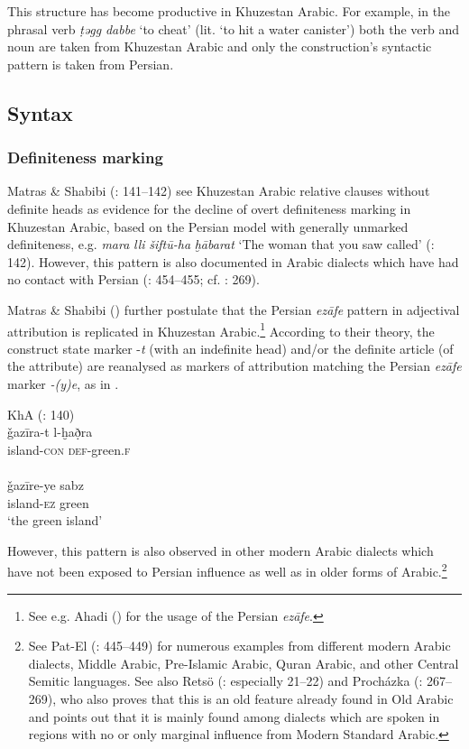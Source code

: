 \documentclass[output=paper,nonflat]{langsci/langscibook}
\begin{document}
This structure has become productive in Khuzestan Arabic. For example, in the phrasal verb \textit{ṭəgg} \textit{dabbe} ‘to cheat’ (lit. ‘to hit a water canister’) both the verb and noun are taken from Khuzestan Arabic and only the construction’s syntactic pattern is taken from Persian. 

\subsection{Syntax}
\subsubsection{Definiteness marking}

Matras \& Shabibi (\citeyear{MatrasShabibi2007}: 141–142) see Khuzestan Arabic relative clauses without definite heads as evidence for the decline of overt definiteness marking in Khuzestan Arabic, based on the Persian model with generally unmarked definiteness, e.g. \textit{mara} \textit{lli} \textit{šiftū-ha} \textit{ḫābarat} ‘The woman that you saw called’ (\citeyear{MatrasShabibi2007}: 142). However, this pattern is also documented in Arabic dialects which have had no contact with Persian (\citealt{Pat-El2017}: 454–455; cf. \citealt{Procházka2018Fertile}: 269).

Matras \& Shabibi (\citeyear[140]{MatrasShabibi2007}) further postulate that the Persian \textit{ezāfe} pattern in adjectival attribution is replicated in Khuzestan Arabic.\footnote{See e.g. Ahadi (\citeyear[103–109]{Ahadi2001}) for the usage of the Persian \textit{ezāfe}.} According to their theory, the construct state marker -\textit{t} (with an indefinite head) and/or the definite article (of the attribute) are reanalysed as markers of attribution matching the Persian  \textit{ezāfe} marker \textit{-(y)e}, as in . 

\ea\label{island}
\ea
{KhA (\citealt{MatrasShabibi2007}: 140)}\\
\gll ǧazīra-t l-ḫað̣ra \\
     island-\textsc{con} \textsc{def}-green.\textsc{f}\\
 
\\
\gll ǧazīre-ye sabz\\
     island-\textsc{ez} green\\
\glt ‘the green island’ 
\z\z

However, this pattern is also observed in other modern Arabic dialects which have not been exposed to Persian influence as well as in older forms of Arabic.\footnote{See Pat-El (\citeyear{Pat-El2017}: 445–449) for numerous examples from different modern Arabic dialects, Middle Arabic, Pre-Islamic Arabic, Quran Arabic, and other Central Semitic languages. See also Retsö (\citeyear{Retsö2009}: especially 21–22) and Procházka (\citeyear{Procházka2018Fertile}: 267–269), who also proves that this is an old feature already found in Old Arabic and points out that it is mainly found among dialects which are spoken in regions with no or only marginal influence from Modern Standard Arabic.} 
\end{document}
